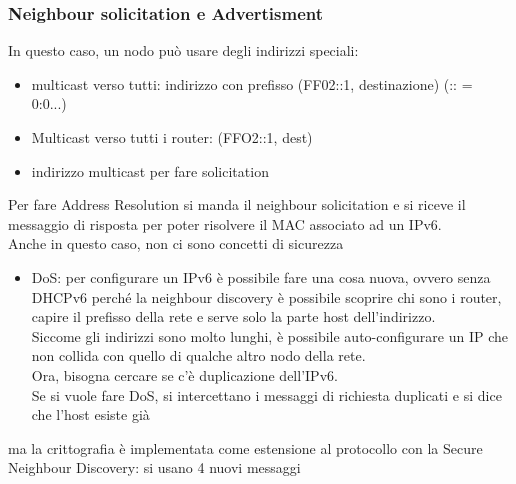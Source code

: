 \documentclass[12pt, oneside]{extbook} %
\begin{document}
\subsubsection{Neighbour solicitation e Advertisment}
In questo caso, un nodo può usare degli indirizzi speciali:
    \begin{itemize}
        \item multicast verso tutti: indirizzo con prefisso (FF02::1, destinazione) (:: = 0:0...)
        \item Multicast verso tutti i router: (FFO2::1, dest)
        \item indirizzo multicast per fare solicitation
    \end{itemize}
Per fare Address Resolution si manda il neighbour solicitation e si riceve il messaggio di risposta per poter risolvere il MAC associato ad un IPv6.
\\Anche in questo caso, non ci sono concetti di sicurezza 
    \begin{itemize}
    \item DoS: per configurare un IPv6 è possibile fare una cosa nuova, ovvero senza DHCPv6 perché la neighbour discovery è possibile scoprire chi sono i router, capire il prefisso della rete e serve solo la parte host dell'indirizzo.
    \\Siccome gli indirizzi sono molto lunghi, è possibile auto-configurare un IP che non collida con quello di qualche altro nodo della rete.
    \\Ora, bisogna cercare se c'è duplicazione dell'IPv6.
    \\Se si vuole fare DoS, si intercettano i messaggi di richiesta duplicati e si dice che l'host esiste già
\end{itemize}
ma la crittografia è implementata come estensione al protocollo con la Secure Neighbour Discovery: si usano 4 nuovi messaggi
\end{document}
